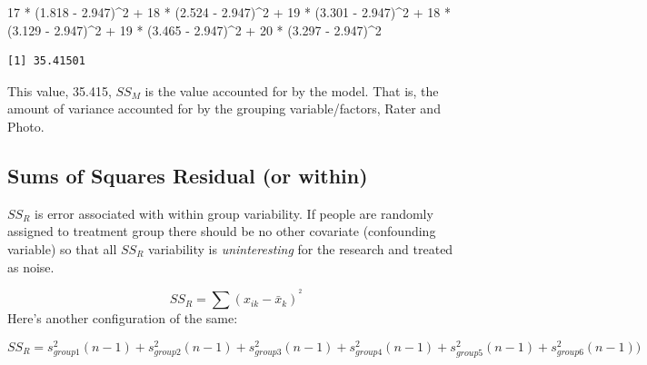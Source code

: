\documentclass[
  11pt,
]{book}
\newenvironment{Shaded}{\begin{snugshade}}{\end{snugshade}}
\newcommand{\DecValTok}[1]{\textcolor[rgb]{0.00,0.00,0.81}{#1}}
\newcommand{\FloatTok}[1]{\textcolor[rgb]{0.00,0.00,0.81}{#1}}
\newcommand{\NormalTok}[1]{#1}
\newcommand{\SpecialCharTok}[1]{\textcolor[rgb]{0.00,0.00,0.00}{#1}}
\begin{document}
\begin{Shaded}
\begin{Highlighting}[]
\DecValTok{17} \SpecialCharTok{*}\NormalTok{ (}\FloatTok{1.818} \SpecialCharTok{{-}} \FloatTok{2.947}\NormalTok{)}\SpecialCharTok{\^{}}\DecValTok{2} \SpecialCharTok{+} \DecValTok{18} \SpecialCharTok{*}\NormalTok{ (}\FloatTok{2.524} \SpecialCharTok{{-}} \FloatTok{2.947}\NormalTok{)}\SpecialCharTok{\^{}}\DecValTok{2} \SpecialCharTok{+} \DecValTok{19} \SpecialCharTok{*}\NormalTok{ (}\FloatTok{3.301} \SpecialCharTok{{-}} \FloatTok{2.947}\NormalTok{)}\SpecialCharTok{\^{}}\DecValTok{2} \SpecialCharTok{+}
    \DecValTok{18} \SpecialCharTok{*}\NormalTok{ (}\FloatTok{3.129} \SpecialCharTok{{-}} \FloatTok{2.947}\NormalTok{)}\SpecialCharTok{\^{}}\DecValTok{2} \SpecialCharTok{+} \DecValTok{19} \SpecialCharTok{*}\NormalTok{ (}\FloatTok{3.465} \SpecialCharTok{{-}} \FloatTok{2.947}\NormalTok{)}\SpecialCharTok{\^{}}\DecValTok{2} \SpecialCharTok{+} \DecValTok{20} \SpecialCharTok{*}\NormalTok{ (}\FloatTok{3.297} \SpecialCharTok{{-}} \FloatTok{2.947}\NormalTok{)}\SpecialCharTok{\^{}}\DecValTok{2}
\end{Highlighting}
\end{Shaded}

\begin{verbatim}
[1] 35.41501
\end{verbatim}

This value, 35.415, \(SS_M\) is the value accounted for by the model. That is, the amount of variance accounted for by the grouping variable/factors, Rater and Photo.

\hypertarget{sums-of-squares-residual-or-within-1}{%
\subsection{Sums of Squares Residual (or within)}\label{sums-of-squares-residual-or-within-1}}

\(SS_R\) is error associated with within group variability. If people are randomly assigned to treatment group there should be no other covariate (confounding variable) so that all \(SS_R\) variability is \emph{uninteresting} for the research and treated as noise.

\[SS_{R}= \sum(x_{ik}-\bar{x}_{k})^{^{2}}\]
Here's another configuration of the same:

\[SS_{R}= s_{group1}^{2}(n-1) + s_{group2}^{2}(n-1) + s_{group3}^{2}(n-1) + s_{group4}^{2}(n-1) + s_{group5}^{2}(n-1) + s_{group6}^{2}(n-1))\]
\end{document}
